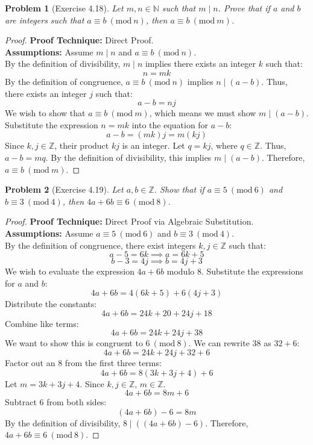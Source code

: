 \documentclass[11pt]{article}
\newtheorem{problem}{Problem}
\newcommand{\Z}{\mathbb{Z}}
\newcommand{\N}{\mathbb{N}}
\newcommand{\modulo}[1]{\ (\mathrm{mod}\ #1)}
\begin{document}
\vspace{0.5cm}

\begin{problem}[Exercise 4.18]
Let $m, n \in \N$ such that $m \mid n$. Prove that if $a$ and $b$ are integers such that $a \equiv b \modulo{n}$, then $a \equiv b \modulo{m}$.
\end{problem}
\begin{proof}
\textbf{Proof Technique:} Direct Proof. \\
\textbf{Assumptions:} Assume $m \mid n$ and $a \equiv b \modulo{n}$. \\
By the definition of divisibility, $m \mid n$ implies there exists an integer $k$ such that:
\[ n = mk \]
By the definition of congruence, $a \equiv b \modulo{n}$ implies $n \mid (a - b)$. Thus, there exists an integer $j$ such that:
\[ a - b = nj \]
We wish to show that $a \equiv b \modulo{m}$, which means we must show $m \mid (a - b)$.
Substitute the expression $n = mk$ into the equation for $a - b$:
\[ a - b = (mk)j = m(kj) \]
Since $k, j \in \Z$, their product $kj$ is an integer. Let $q = kj$, where $q \in \Z$.
Thus, $a - b = mq$. By the definition of divisibility, this implies $m \mid (a - b)$.
Therefore, $a \equiv b \modulo{m}$.
\end{proof}

\vspace{0.5cm}

\begin{problem}[Exercise 4.19]
Let $a, b \in \Z$. Show that if $a \equiv 5 \modulo{6}$ and $b \equiv 3 \modulo{4}$, then $4a + 6b \equiv 6 \modulo{8}$.
\end{problem}
\begin{proof}
\textbf{Proof Technique:} Direct Proof via Algebraic Substitution. \\
\textbf{Assumptions:} Assume $a \equiv 5 \modulo{6}$ and $b \equiv 3 \modulo{4}$. \\
By the definition of congruence, there exist integers $k, j \in \Z$ such that:
\[ a - 5 = 6k \implies a = 6k + 5 \]
\[ b - 3 = 4j \implies b = 4j + 3 \]
We wish to evaluate the expression $4a + 6b$ modulo 8. Substitute the expressions for $a$ and $b$:
\[ 4a + 6b = 4(6k + 5) + 6(4j + 3) \]
Distribute the constants:
\[ 4a + 6b = 24k + 20 + 24j + 18 \]
Combine like terms:
\[ 4a + 6b = 24k + 24j + 38 \]
We want to show this is congruent to $6 \modulo{8}$. We can rewrite 38 as $32 + 6$:
\[ 4a + 6b = 24k + 24j + 32 + 6 \]
Factor out an 8 from the first three terms:
\[ 4a + 6b = 8(3k + 3j + 4) + 6 \]
Let $m = 3k + 3j + 4$. Since $k, j \in \Z$, $m \in \Z$.
\[ 4a + 6b = 8m + 6 \]
Subtract 6 from both sides:
\[ (4a + 6b) - 6 = 8m \]
By the definition of divisibility, $8 \mid ((4a + 6b) - 6)$.
Therefore, $4a + 6b \equiv 6 \modulo{8}$.
\end{proof}
\end{document}
